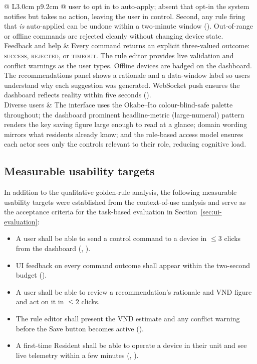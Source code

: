 \begin{longtable}{@{} L{3.0cm} p{9.2cm} @{}}
    user to opt in to auto-apply; absent that opt-in the system notifies but takes no
    action, leaving the user in control.  Second, any rule firing that \emph{is}
    auto-applied can be undone within a two-minute window ().
    Out-of-range or offline commands are rejected cleanly without changing device state. \\
  \addlinespace
  Feedback and help &
    Every command returns an explicit three-valued outcome: \textsc{success},
    \textsc{rejected}, or \textsc{timeout}.  The rule editor provides live validation and
    conflict warnings as the user types.  Offline devices are badged on the dashboard.
    The recommendations panel shows a rationale and a data-window label so users
    understand why each suggestion was generated.  WebSocket push ensures the dashboard
    reflects reality within five seconds (). \\
  \addlinespace
  Diverse users &
    The interface uses the Okabe--Ito colour-blind-safe palette throughout; the
    dashboard prominent headline-metric (large-numeral) pattern renders the key saving
    figure large enough to read at a glance; domain wording mirrors what residents already
    know; and the role-based access model ensures each actor sees only the controls
    relevant to their role, reducing cognitive load. \\
\end{longtable}

\subsection{Measurable usability targets}

In addition to the qualitative golden-rule analysis, the following measurable usability
targets were established from the context-of-use analysis and serve as the acceptance
criteria for the task-based evaluation in Section~\ref{sec:ui-evaluation}:

\begin{itemize}
  \item A user shall be able to send a control command to a device in $\le 3$ clicks
        from the dashboard (, ).
  \item UI feedback on every command outcome shall appear within the two-second
        budget ().
  \item A user shall be able to review a recommendation's rationale and VND figure
        and act on it in $\le 2$ clicks.
  \item The rule editor shall present the VND estimate and any conflict warning before
        the Save button becomes active ().
  \item A first-time Resident shall be able to operate a device in their unit and see live
        telemetry within a few minutes (, ).
\end{itemize}

